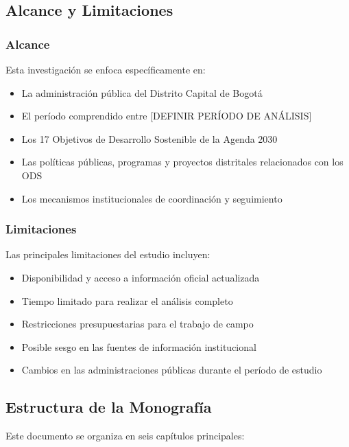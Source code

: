 \subsection{Alcance y Limitaciones}

\subsubsection{Alcance}

Esta investigación se enfoca específicamente en:

\begin{itemize}
    \item La administración pública del Distrito Capital de Bogotá
    \item El período comprendido entre [DEFINIR PERÍODO DE ANÁLISIS]
    \item Los 17 Objetivos de Desarrollo Sostenible de la Agenda 2030
    \item Las políticas públicas, programas y proyectos distritales relacionados con los ODS
    \item Los mecanismos institucionales de coordinación y seguimiento
\end{itemize}

\subsubsection{Limitaciones}

Las principales limitaciones del estudio incluyen:

\begin{itemize}
    \item Disponibilidad y acceso a información oficial actualizada
    \item Tiempo limitado para realizar el análisis completo
    \item Restricciones presupuestarias para el trabajo de campo
    \item Posible sesgo en las fuentes de información institucional
    \item Cambios en las administraciones públicas durante el período de estudio
\end{itemize}

\subsection{Estructura de la Monografía}

Este documento se organiza en seis capítulos principales:

